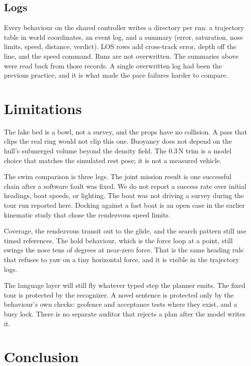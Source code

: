 \documentclass[conference]{IEEEtran}
\begin{document}
\subsection{Logs}
Every behaviour on the shared controller writes a directory per run: a trajectory table in world coordinates, an event log, and a summary (error, saturation, nose limits, speed, distance, verdict). LOS rows add cross-track error, depth off the line, and the speed command. Runs are not overwritten. The summaries above were read back from those records. A single overwritten log had been the previous practice, and it is what made the pace failures harder to compare.

\section{Limitations}
\label{sec:limits}

The lake bed is a bowl, not a survey, and the props have no collision. A pass that clips the real ring would not clip this one. Buoyancy does not depend on the hull's submerged volume beyond the density field. The 0.3\,N trim is a model choice that matches the simulated rest pose; it is not a measured vehicle.

The swim comparison is three legs. The joint mission result is one successful chain after a software fault was fixed. We do not report a success rate over initial headings, boat speeds, or lighting. The boat was not driving a survey during the tour run reported here. Docking against a fast boat is an open case in the earlier kinematic study that chose the rendezvous speed limits.

Coverage, the rendezvous transit out to the glide, and the search pattern still use timed references. The hold behaviour, which is the force loop at a point, still swings the nose tens of degrees at near-zero force. That is the same heading rule that refuses to yaw on a tiny horizontal force, and it is visible in the trajectory logs.

The language layer will still fly whatever typed step the planner emits. The fixed tour is protected by the recognizer. A novel sentence is protected only by the behaviour's own checks: geofence and acceptance tests where they exist, and a busy lock. There is no separate auditor that rejects a plan after the model writes it.

\section{Conclusion}
\label{sec:conclusion}
\end{document}
